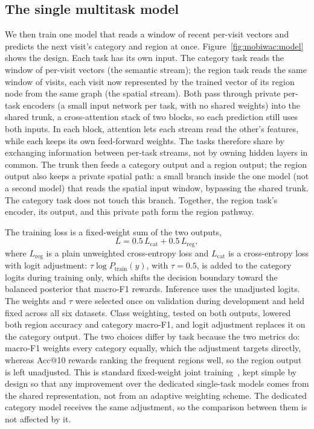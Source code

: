 \subsection{The single multitask model}
\label{sec:mobiwac:method-model}

We then train one model that reads a window of recent per-visit vectors and predicts the next visit's category and region at once. Figure~\ref{fig:mobiwac:model} shows the design. Each task has its own input. The category task reads the window of per-visit vectors (the semantic stream); the region task reads the same window of visits, each visit now represented by the trained vector of its region node from the same graph (the spatial stream). Both pass through private
per-task encoders (a small input network per task, with no shared weights) into the shared trunk, a cross-attention stack of two blocks, so each prediction still uses both inputs. In each block, attention lets each
stream read the other's features, while each keeps its own feed-forward
weights. The tasks therefore share by exchanging information between per-task
streams, not by owning hidden layers in common. The trunk then feeds a category output and a region output; the region output also keeps a private spatial path: a small branch inside the one model (not a second model) that reads the spatial input window, bypassing the shared trunk. The category task does not touch this branch. Together, the region task's encoder, its output, and this private path form the region pathway.

The training loss is a fixed-weight sum of the two outputs,
\begin{equation}\label{eq:mobiwac:loss}
L = 0.5\,L_{\mathrm{cat}} + 0.5\,L_{\mathrm{reg}},
\end{equation}
where $L_{\mathrm{reg}}$ is a plain unweighted cross-entropy loss and $L_{\mathrm{cat}}$ is a
cross-entropy loss with logit adjustment: $\tau\log P_{\mathrm{train}}(y)$, with $\tau=0.5$, is added
to the category logits during training only, which shifts the decision boundary toward the balanced
posterior that macro-F1 rewards. Inference uses the unadjusted logits. The weights and $\tau$ were
selected once on validation during development and held fixed across all six datasets. Class
weighting, tested on both outputs, lowered both region accuracy and category macro-F1, and logit
adjustment replaces it on the category output. The two choices differ by task because the two
metrics do: macro-F1 weights every category equally, which the adjustment targets directly, whereas
Acc@10 rewards ranking the frequent regions well, so the region output is left unadjusted. This is
standard fixed-weight joint training~\cite{caruana1997multitask}, kept simple by design so that any
improvement over the dedicated single-task models comes from the shared representation, not from an
adaptive weighting scheme. The dedicated category model receives the same adjustment, so the
comparison between them is not affected by it.

